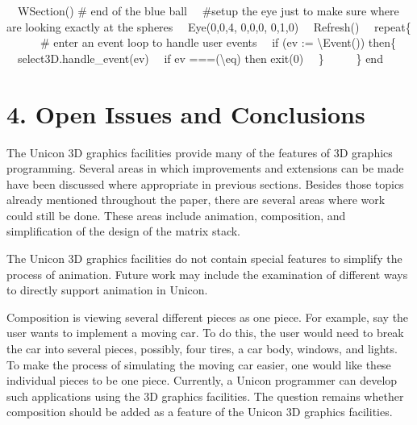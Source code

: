 \documentclass[letterpaper]{article}
\begin{document}
{{ \ \ WSection() \# end of the blue ball \newline
\newline
 \ \ \#setup the eye just to make sure where are looking exactly at the spheres\newline
 \ \ Eye(0,0,4, 0,0,0, 0,1,0)\newline
 \ \ Refresh() \newline
 \ \ repeat\{ \ \ \ \ \ \ \# enter an event loop to handle user events \newline
 \ \ if (ev := {\textbackslash}Event()) then\{\newline
\ \  select3D.handle\_event(ev)\newline
\ \  if ev ===({\textquotedbl}{\textbackslash}e{\textquotedbl}{\textbar}{\textquotedbl}q{\textquotedbl}) then
exit(0)\newline
\ \  \} \newline
 \ \ \ \ \ \}\newline
end}



\section[4. Open Issues and Conclusions]{4. Open Issues and Conclusions}


{
The Unicon 3D graphics facilities provide many of the features of 3D graphics programming. Several areas in which
improvements and extensions can be made have been discussed where appropriate in previous sections. Besides those
topics already mentioned throughout the paper, there are several areas where work could still be done. These areas
include animation, composition, and simplification of the design of the matrix stack. }

{
The Unicon 3D graphics facilities do not contain special features to simplify the process of animation. Future work may
include the examination of different ways to directly support animation in Unicon.}

{
Composition is viewing several different pieces as one piece. For example, say the user wants to implement a moving car.
To do this, the user would need to break the car into several pieces, possibly, four tires, a car body, windows, and
lights. To make the process of simulating the moving car easier, one would like these individual pieces to be one
piece. Currently, a Unicon programmer can develop such applications using the 3D graphics facilities. The question
remains whether composition should be added as a feature of the Unicon 3D graphics facilities.}

}
\end{document}
